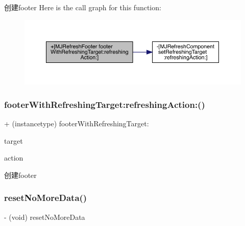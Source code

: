 创建footer Here is the call graph for this function\+:\nopagebreak
\begin{figure}[H]
\begin{center}
\leavevmode
\includegraphics[width=350pt]{interface_m_j_refresh_footer_a5cafac545e56be7cad42b8f3919a8d23_cgraph}
\end{center}
\end{figure}
\mbox{\label{interface_m_j_refresh_footer_a5cafac545e56be7cad42b8f3919a8d23}} 
\subsubsection{\texorpdfstring{footer\+With\+Refreshing\+Target\+:refreshing\+Action\+:()}{footerWithRefreshingTarget:refreshingAction:()}\hspace{0.1cm}{\footnotesize\ttfamily [3/3]}}
{\footnotesize\ttfamily + (instancetype) footer\+With\+Refreshing\+Target\+: \begin{DoxyParamCaption}\item[{(id)}]{target }\item[{refreshingAction:(S\+EL)}]{action }\end{DoxyParamCaption}}

创建footer \mbox{\label{interface_m_j_refresh_footer_acb5311ed278d03315d8c00a538360ecc}} 
\subsubsection{\texorpdfstring{reset\+No\+More\+Data()}{resetNoMoreData()}\hspace{0.1cm}{\footnotesize\ttfamily [1/3]}}
{\footnotesize\ttfamily -\/ (void) reset\+No\+More\+Data \begin{DoxyParamCaption}{ }\end{DoxyParamCaption}}

